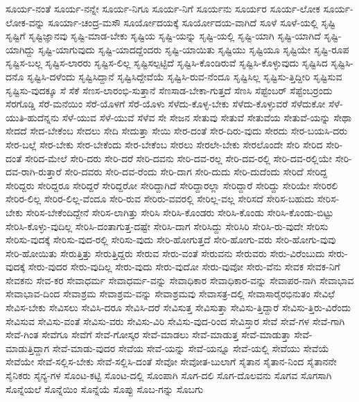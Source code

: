 {ಸೂರ್ಯ-ನಂತೆ
ಸೂರ್ಯ-ನನ್ನೇ
ಸೂರ್ಯ-ನಿಗೂ
ಸೂರ್ಯ-ನಿಗೆ
ಸೂರ್ಯನು
ಸೂರ್ಯರ
ಸೂರ್ಯ-ಲೋಕ
ಸೂರ್ಯ-ಲೋಕ-ವನ್ನು
ಸೂರ್ಯಾ-ಚಂದ್ರ-ಮಸೌ
ಸೂರ್ಯೋದಯಕ್ಕೆ
ಸೂರ್ಯೋದಯ-ವಾಗಿದೆ
ಸೂಳೆ
ಸೂಳೆ-ಯಲ್ಲಿ
ಸೃಷ್ಟಿ
ಸೃಷ್ಟಿಗೆ
ಸೃಷ್ಟಿಜ್ಞಾನವು
ಸೃಷ್ಟಿ-ಮಾಡ-ಬೇಕು
ಸೃಷ್ಟಿಯ
ಸೃಷ್ಟಿ-ಯನ್ನು
ಸೃಷ್ಟಿ-ಯಲ್ಲಿ
ಸೃಷ್ಟಿ-ಯಾಗಿ
ಸೃಷ್ಟಿ-ಯಾಗಿದೆ
ಸೃಷ್ಟಿ-ಯಾಗಿದ್ದು
ಸೃಷ್ಟಿ-ಯಾಗುವುದು
ಸೃಷ್ಟಿ-ಯಾದದ್ದೆಂದರು
ಸೃಷ್ಟಿ-ಯಾಯಿತು
ಸೃಷ್ಟಿಯು
ಸೃಷ್ಟಿಯೂ
ಸೃಷ್ಟಿಯೇ
ಸೃಷ್ಟಿ-ರೂಪ
ಸೃಷ್ಟಿಸ-ಬಲ್ಲ
ಸೃಷ್ಟಿಸ-ಲಾರರು
ಸೃಷ್ಟಿಸ-ಲಿಲ್ಲ
ಸೃಷ್ಟಿಸಲ್ಪಟ್ಟಿದೆ
ಸೃಷ್ಟಿಸಿ-ಕೊಂಡಿರುವೆ
ಸೃಷ್ಟಿಸಿ-ಕೊಳ್ಳುವುದು
ಸೃಷ್ಟಿಸಿದ
ಸೃಷ್ಟಿಸಿ-ದನೊ
ಸೃಷ್ಟಿಸಿ-ದಳೆಂದು
ಸೃಷ್ಟಿಸಿದ್ದಾನೆ
ಸೃಷ್ಟಿಸಿದ್ದೇವೆಯೆ
ಸೃಷ್ಟಿಸಿ-ರುವ-ನೆಂದೂ
ಸೃಷ್ಟಿಸಿಲ್ಲ
ಸೃಷ್ಟಿಸು-ತ್ತಿದ್ದೀರಿ
ಸೃಷ್ಟಿಸುವ
ಸೃಷ್ಟಿಸು-ವುದಕ್ಕೂ
ಸೆ
ಸೆಕೆ
ಸೆಣಸ-ಲಾರಂಭಿ-ಸುತ್ತಾನೆ
ಸೆಣಸಾಡ-ಬೇಕಾ-ಗುತ್ತದೆ
ಸೆಣಸಿ
ಸೆಪ್ಟೆಂಬರ್
ಸೆಪ್ಟೆಂಬರ್ರಂದು
ಸೆರಗೊಡ್ಡಿ
ಸೆರೆ-ಮನೆಯಿಂ
ಸೆರೆ-ಯೊಳಗೆ
ಸೆರೆ-ಯೊಳು
ಸೆಳೆದು-ಕೊಳ್ಳ-ಬೇಕು
ಸೆಳೆದು-ಕೊಳ್ಳುವರೆ
ಸೆಳೆದುಕೋ
ಸೆಳೆ-ಯುತಿ-ಹುದೆನ್ನನು
ಸೆಳೆ-ಯುವ
ಸೆಳೆ-ಯುವೆ
ಸೆಳೆವ
ಸೇ
ಸೇಜನ
ಸೇತುವು
ಸೇತುವೆ
ಸೇತುವೆಯ
ಸೇತುವೆ-ಯನ್ನು
ಸೇಥಾ
ಸೇದದೆ
ಸೇದ-ಬೇಕೆಂಬ
ಸೇದಲು
ಸೇದಿ
ಸೇದುತ್ತಾ
ಸೇಯಿ
ಸೇರ-ದಂತೆ
ಸೇರ-ದಿರು-ವುದು
ಸೇರದು
ಸೇರ-ಬಯಸಿ-ದರು
ಸೇರ-ಬಲ್ಲೆ
ಸೇರ-ಬೇಕು
ಸೇರ-ಬೇಕೆಂದು
ಸೇರ-ಬೇಕೆಂಬ
ಸೇರಲು
ಸೇರಲೇ-ಬೇಕು
ಸೇರಲೊಂದೇ
ಸೇರಿ
ಸೇರಿದ
ಸೇರಿ-ದಂತೆ
ಸೇರಿದ-ಮೇಲೆ
ಸೇರಿ-ದರು
ಸೇರಿ-ದರೆ
ಸೇರಿ-ದವನು
ಸೇರಿ-ದವ-ರಲ್ಲ
ಸೇರಿ-ದವ-ರಲ್ಲಿ
ಸೇರಿ-ದವ-ರಲ್ಲಿಯೇ
ಸೇರಿ-ದವ-ರಾಗಿ-ರುತ್ತಾರೆ
ಸೇರಿ-ದವರು
ಸೇರಿ-ದವ-ರೆಂದು
ಸೇರಿ-ದಾಗ
ಸೇರಿ-ದುದು
ಸೇರಿ-ದುದೆಂದು
ಸೇರಿದೆ
ಸೇರಿದ್ದ
ಸೇರಿದ್ದರು
ಸೇರಿದ್ದರೂ
ಸೇರಿದ್ದರೆ
ಸೇರಿದ್ದರೋ
ಸೇರಿದ್ದಾಗಿದೆ
ಸೇರಿದ್ದಾರಲ್ಲಾ
ಸೇರಿದ್ದಾರೆ
ಸೇರಿದ್ದು
ಸೇರಿಯೇ
ಸೇರಿರಲಿ
ಸೇರಿರ-ಲಿಲ್ಲ
ಸೇರಿರ-ಲಿಲ್ಲ-ವೆಂದೂ
ಸೇರಿ-ರುವ
ಸೇರಿರು-ವವರಲ್ಲಿ
ಸೇರಿಲ್ಲ-ವಲ್ಲ
ಸೇರಿಸದೆ
ಸೇರಿಸ-ಬಹುದು
ಸೇರಿಸ-ಬೇಕು
ಸೇರಿಸ-ಬೇಕೆಂದಿದ್ದೇನೆ
ಸೇರಿಸ-ಲಾಗಿತ್ತು
ಸೇರಿಸಿ
ಸೇರಿಸಿ-ಕೊಂಡರು
ಸೇರಿಸಿ-ಕೊಂಡು
ಸೇರಿಸಿ-ಕೊಂಡು-ಬಿಟ್ಟು
ಸೇರಿಸಿ-ಕೊಳ್ಳು-ವುದಿಲ್ಲ
ಸೇರಿಸಿ-ದಂತಾಗುತ್ತ-ದಷ್ಟೇ
ಸೇರಿಸಿ-ದಾಗ
ಸೇರಿಸಿದ್ದು
ಸೇರಿಸಿರಿ
ಸೇರಿಸಿ-ರು-ವುದೇ
ಸೇರಿಸು
ಸೇರಿಸು-ವುದಕ್ಕೆ
ಸೇರಿಸು-ವುದ-ರಲ್ಲಿ
ಸೇರಿಸು-ವುದು
ಸೇರಿ-ಹೋಗುತ್ತದೆ
ಸೇರಿ-ಹೋಗು-ವರು
ಸೇರಿ-ಹೋಗು-ವುವು
ಸೇರಿ-ಹೋಯಿತು
ಸೇರುತ್ತಿತ್ತು
ಸೇರುತ್ತಿದ್ದರು
ಸೇರುವ
ಸೇರು-ವಂತೆ
ಸೇರುವನು
ಸೇರುವರು
ಸೇರು-ವಿರೆಂಬುದು
ಸೇರು-ವುದಕ್ಕೆ
ಸೇರು-ವುದರ
ಸೇರು-ವುದಿಲ್ಲ
ಸೇರು-ವುದು
ಸೇರು-ವುದೋ
ಸೇರು-ವುವೋ
ಸೇರು-ವೆನು
ಸೇವಕ
ಸೇವಕ-ನಿಗೆ
ಸೇವಕನು
ಸೇವ-ಕರ
ಸೇವಾಧರ್ಮ
ಸೇವಾಧರ್ಮ-ವನ್ನು
ಸೇವಾಧಿಕಾರ
ಸೇವಾಧಿಕಾರ-ವನ್ನು
ಸೇವಾಪರ-ನಾಗಿ
ಸೇವಾಭಾವ
ಸೇವಾಭಾವ-ದಿಂದ
ಸೇವಾಶ್ರಮ
ಸೇವಾಶ್ರಮ-ವನ್ನು
ಸೇವಾಶ್ರಮವು
ಸೇವಾಸತ್ರ-ದಲ್ಲಿ
ಸೇವಾಸಾರೈರಭಿನುತಂ
ಸೇವಿಛೆ
ಸೇವಿಸ-ಬೇಕು
ಸೇವಿಸಲು
ಸೇವಿಸಿ-ದರೂ
ಸೇವಿಸಿ-ದರೆ
ಸೇವಿಸುತ್ತ
ಸೇವಿಸುತ್ತಾ
ಸೇವಿಸು-ತ್ತಿದ್ದಾರೆ
ಸೇವಿಸು-ತ್ತಿರು-ವಿರೆಂದು
ಸೇವಿಸುವ
ಸೇವಿಸು-ವಂತೆ
ಸೇವಿಸು-ವರು
ಸೇವಿಸು-ವಿರಿ
ಸೇವಿಸು-ವುದ-ರಿಂದ
ಸೇವಿಸ್ತಾರ
ಸೇವೆ
ಸೇವೆ-ಗಳ
ಸೇವೆ-ಗಾಗಿ
ಸೇವೆ-ಗಿಂತ
ಸೇವೆಗೂ
ಸೇವೆಗೆ
ಸೇವೆ-ಗೋಸ್ಕರ
ಸೇವೆ-ಮಾಡಲು
ಸೇವೆ-ಮಾಡುತ್ತ
ಸೇವೆ-ಮಾಡುತ್ತಾ
ಸೇವೆ-ಮಾಡುತ್ತಿದ್ದಾಗ
ಸೇವೆ-ಮಾಡು-ವುದರ
ಸೇವೆಯ
ಸೇವೆ-ಯನ್ನು
ಸೇವೆ-ಯನ್ನೂ
ಸೇವೆ-ಯಲ್ಲಿ
ಸೇವೆಯು
ಸೇವೆಯೆ
ಸೇವೆಯೇ
ಸೇವೆ-ಸಲ್ಲಿಸ-ಬೇಕು
ಸೇವೆ-ಸಲ್ಲಿಸಿ-ದಂತೆ
ಸೇವೋ
ಸೇವೋತ-ಬುಲಾಗೆ
ಸೈತಾನ
ಸೈತಾನ-ನಿಂದ
ಸೈತಾನನೇ
ಸೈನಿಕರು
ಸೈನ್ಯ-ಗಳ
ಸೊಂಟ-ಕಟ್ಟಿ
ಸೊಂಟ-ದಲ್ಲಿ
ಸೊಂಪಾಗಿ
ಸೊಗ-ದಲಿ
ಸೊಗ-ದೊಲವನು
ಸೊಗವ
ಸೊಗಸಾಗಿ
ಸೊನ್ನೆಯಲೆ
ಸೊನ್ನೆಯಿಂ
ಸೊನ್ನೆಯೆ
ಸೊಪ್ಪು
ಸೊಬ-ಗನ್ನು
ಸೊಬಗು
}
